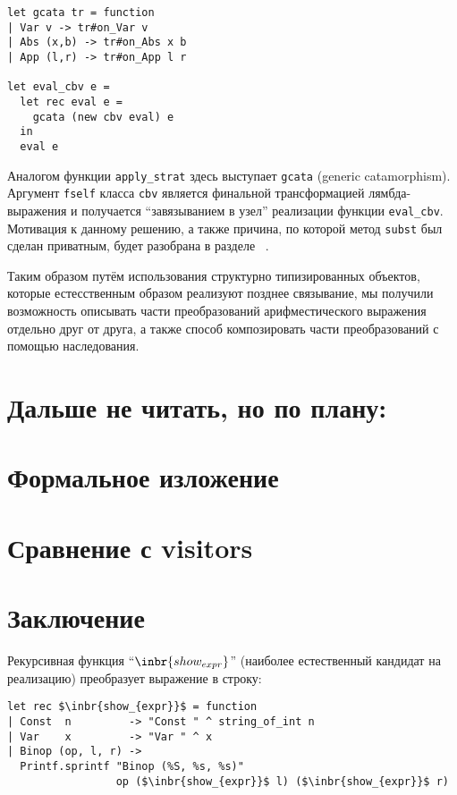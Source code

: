 \begin{lstlisting}
let gcata tr = function 
| Var v -> tr#on_Var v 
| Abs (x,b) -> tr#on_Abs x b 
| App (l,r) -> tr#on_App l r

let eval_cbv e =
  let rec eval e = 
    gcata (new cbv eval) e 
  in
  eval e
\end{lstlisting}

Аналогом функции \lstinline{apply_strat} здесь выступает \lstinline{gcata} (generic catamorphism). Аргумент \lstinline{fself} класса \lstinline{cbv} является финальной трансформацией лямбда-выражения и получается ``завязыванием в узел'' реализации функции \lstinline{eval_cbv}. Мотивация к данному решению, а также причина, по которой метод \lstinline{subst} был сделан приватным, будет разобрана в разделе ~\cite{related}.

Таким образом путём использования структурно типизированных объектов, которые естесственным образом реализуют позднее связывание, мы получили возможность описывать части преобразований арифместического выражения отдельно друг от друга, а также способ композировать части преобразований с помощью наследования.




\section{Дальше не читать, но по плану:}
\section{Формальное изложение}
\section{Сравнение с visitors}
\section{Заключение}

Рекурсивная функция ``$\inbr{show_{expr}}$'' (наиболее естественный кандидат на реализацию)
преобразует выражение в строку: 

\begin{lstlisting}
let rec $\inbr{show_{expr}}$ = function
| Const  n         -> "Const " ^ string_of_int n
| Var    x         -> "Var " ^ x
| Binop (op, l, r) ->
  Printf.sprintf "Binop (%S, %s, %s)" 
                 op ($\inbr{show_{expr}}$ l) ($\inbr{show_{expr}}$ r)
\end{lstlisting}

